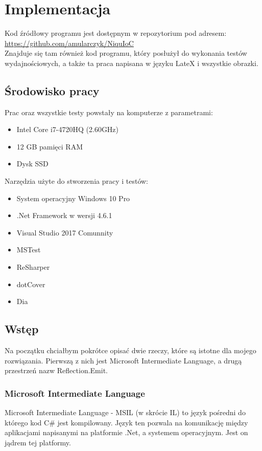 \documentclass[12pt]{article}
\begin{document}
\clearpage
\section{Implementacja}
Kod źródłowy programu jest dostępnym w repozytorium pod adresem:\\
\url{https://github.com/amularczyk/NiquIoC}\\
Znajduje się tam również kod programu, który posłużył do wykonania testów wydajnościowych, a także ta praca napisana w języku LateX i wszystkie obrazki.

\subsection{Środowisko pracy}
Prac oraz wszystkie testy powstały na komputerze z parametrami:
\begin{itemize}
	\item Intel Core i7-4720HQ (2.60GHz)
	\item 12 GB pamięci RAM
	\item Dysk SSD
\end{itemize}
Narzędzia użyte do stworzenia pracy i testów:
\begin{itemize}
	\item System operacyjny Windows 10 Pro
	\item .Net Framework w wersji 4.6.1
	\item Visual Studio 2017 Comunnity
	\item MSTest
	\item ReSharper
	\item dotCover
	\item Dia
\end{itemize}


\subsection{Wstęp}
Na początku chciałbym pokrótce opisać dwie rzeczy, które są istotne dla mojego rozwiązania. Pierwszą z nich jest Microsoft Intermediate Language, a drugą przestrzeń nazw Reflection.Emit.

\subsubsection{Microsoft Intermediate Language}
Microsoft Intermediate Language - MSIL (w skrócie IL) to język pośredni do którego kod C\# jest kompilowany. Język ten pozwala na komunikację między aplikacjami napisanymi na platformie .Net, a systemem operacyjnym. Jest on jądrem tej platformy.
\end{document}
